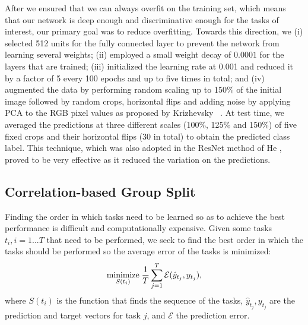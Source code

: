 \documentclass[10pt,twocolumn,letterpaper]{article}
\begin{document}
	After we ensured that we can always overfit on the training set, which means that our network is deep enough and discriminative enough for the tasks of interest, our primary goal was to reduce overfitting. Towards this direction, we (i) selected 512 units for the fully connected layer to prevent the network from learning several weights; (ii) employed a small weight decay of \(0.0001\) for the layers that are trained; (iii) initialized the learning rate at 0.001 and reduced it by a factor of 5 every 100 epochs and up to five times in total; and (iv) augmented the data by performing random scaling up to 150\% of the initial image followed by random crops, horizontal flips and adding noise by applying PCA to the RGB pixel values as proposed by Krizhevsky \etal~\cite{krizhevsky2012imagenet}. At test time, we averaged the predictions at three different scales (100\%, 125\% and 150\%) of five fixed crops and their horizontal flips (30 in total) to obtain the predicted class label. This technique, which was also adopted in the ResNet method of He \etal \cite{resNets2016}, proved to be very effective as it reduced the variation on the predictions.
	
	
	\subsection{Correlation-based Group Split}
	Finding the order in which tasks need to be learned so as to achieve the best performance is difficult and computationally expensive. Given some tasks \(t_i, i=1...T\) that need to be performed, we seek to find the best order in which the tasks should be performed so the average error of the tasks is minimized: 
	\begin{equation}\label{eq:1}
	\displaystyle \underset{\substack{S(t_i)}}{\text{minimize}} \; {\frac{1}{T}\sum\limits_{j=1}^{T} \mathcal{E}(\hat{y}_{t_j},y_{t_j}),}\\
	\end{equation}
	where \(S(t_i)\) is the function that finds the sequence of the tasks, \(\hat{y}_{t_j},y_{t_j}\) are the prediction and target vectors for task \(j\), and \(\mathcal{E}\) the prediction error. 
	
\end{document}

